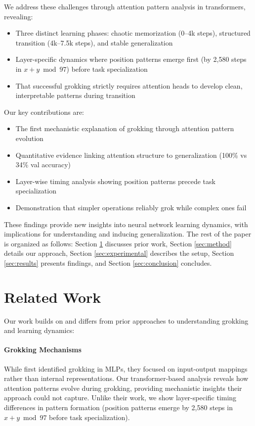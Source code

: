 \documentclass{article} %
\begin{document}
We address these challenges through attention pattern analysis in transformers, revealing:
\begin{itemize}
    \item Three distinct learning phases: chaotic memorization (0--4k steps), structured transition (4k--7.5k steps), and stable generalization
    \item Layer-specific dynamics where position patterns emerge first (by 2,580 steps in $x+y \bmod 97$) before task specialization
    \item That successful grokking strictly requires attention heads to develop clean, interpretable patterns during transition
\end{itemize}

Our key contributions are:
\begin{itemize}
    \item The first mechanistic explanation of grokking through attention pattern evolution
    \item Quantitative evidence linking attention structure to generalization (100\% vs 34\% val accuracy)
    \item Layer-wise timing analysis showing position patterns precede task specialization
    \item Demonstration that simpler operations reliably grok while complex ones fail
\end{itemize}

These findings provide new insights into neural network learning dynamics, with implications for understanding and inducing generalization. The rest of the paper is organized as follows: Section \ref{sec:related} discusses prior work, Section \ref{sec:method} details our approach, Section \ref{sec:experimental} describes the setup, Section \ref{sec:results} presents findings, and Section \ref{sec:conclusion} concludes.

\section{Related Work}
\label{sec:related}

Our work builds on and differs from prior approaches to understanding grokking and learning dynamics:

\paragraph{Grokking Mechanisms} While \citet{power2022grokking} first identified grokking in MLPs, they focused on input-output mappings rather than internal representations. Our transformer-based analysis reveals how attention patterns evolve during grokking, providing mechanistic insights their approach could not capture. Unlike their work, we show layer-specific timing differences in pattern formation (position patterns emerge by 2,580 steps in $x+y \bmod 97$ before task specialization).
\end{document}
